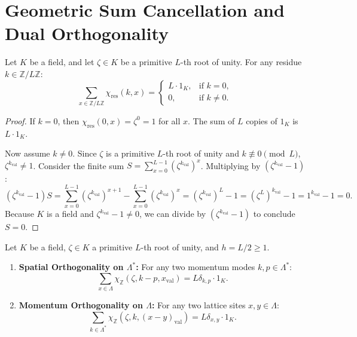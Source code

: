 \section{Geometric Sum Cancellation and Dual Orthogonality}

\begin{lemma}
\label{lem:nontrivial_character_sum}
Let $K$ be a field, and let $\zeta \in K$ be a primitive $L$-th root of unity. For any residue $k \in \mathbb{Z}/L\mathbb{Z}$:
\begin{equation}
\sum_{x \in \mathbb{Z}/L\mathbb{Z}} \chi_{\mathrm{res}}(k, x) = \begin{cases} L \cdot 1_K, & \text{if } k = 0, \\ 0, & \text{if } k \neq 0. \end{cases}
\end{equation}
\end{lemma}

\begin{proof}
If $k = 0$, then $\chi_{\mathrm{res}}(0, x) = \zeta^0 = 1$ for all $x$. The sum of $L$ copies of $1_K$ is $L \cdot 1_K$.

Now assume $k \neq 0$. Since $\zeta$ is a primitive $L$-th root of unity and $k \not\equiv 0 \pmod L$, $\zeta^{k_{\mathrm{val}}} \neq 1$.
Consider the finite sum $S = \sum_{x=0}^{L-1} (\zeta^{k_{\mathrm{val}}})^x$. Multiplying by $(\zeta^{k_{\mathrm{val}}} - 1)$:
\[
(\zeta^{k_{\mathrm{val}}} - 1) S = \sum_{x=0}^{L-1} (\zeta^{k_{\mathrm{val}}})^{x+1} - \sum_{x=0}^{L-1} (\zeta^{k_{\mathrm{val}}})^x = (\zeta^{k_{\mathrm{val}}})^L - 1 = (\zeta^L)^{k_{\mathrm{val}}} - 1 = 1^{k_{\mathrm{val}}} - 1 = 0.
\]
Because $K$ is a field and $\zeta^{k_{\mathrm{val}}} - 1 \neq 0$, we can divide by $(\zeta^{k_{\mathrm{val}}} - 1)$ to conclude $S = 0$.
\end{proof}

\begin{theorem}
\label{thm:app_orthogonality}
Let $K$ be a field, $\zeta \in K$ a primitive $L$-th root of unity, and $h = L/2 \ge 1$.
\begin{enumerate}
    \item \textbf{Spatial Orthogonality on $\Lambda^*$:} For any two momentum modes $k, p \in \Lambda^*$:
    \begin{equation}
    \sum_{x \in \Lambda} \chi_{\mathbb{Z}}(\zeta, k - p, x_{\mathrm{val}}) = L \delta_{k, p} \cdot 1_K.
    \end{equation}
    \item \textbf{Momentum Orthogonality on $\Lambda$:} For any two lattice sites $x, y \in \Lambda$:
    \begin{equation}
    \sum_{k \in \Lambda^*} \chi_{\mathbb{Z}}(\zeta, k, (x - y)_{\mathrm{val}}) = L \delta_{x, y} \cdot 1_K.
    \end{equation}
\end{enumerate}
\end{theorem}


